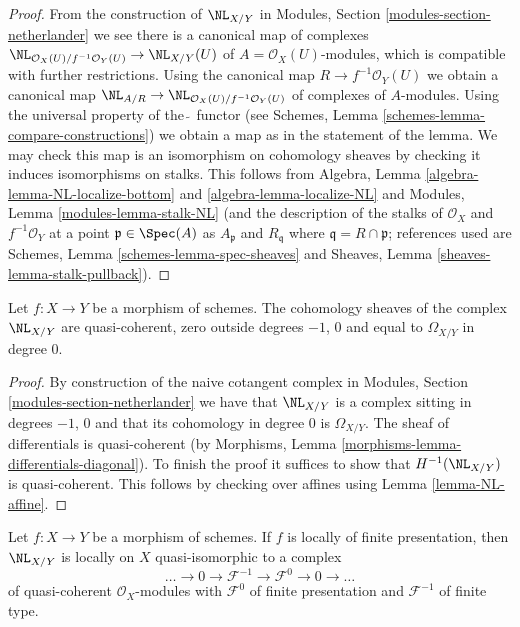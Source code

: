 \begin{proof}
From the construction of $\NL_{X/Y}$ in
Modules, Section \ref{modules-section-netherlander}
we see there is a canonical map of complexes
$\NL_{\mathcal{O}_X(U)/f^{-1}\mathcal{O}_Y(U)} \to \NL_{X/Y}(U)$
of $A = \mathcal{O}_X(U)$-modules, which is compatible
with further restrictions. Using the canonical map
$R \to f^{-1}\mathcal{O}_Y(U)$ we obtain a canonical map
$\NL_{A/R} \to \NL_{\mathcal{O}_X(U)/f^{-1}\mathcal{O}_Y(U)}$
of complexes of $A$-modules.
Using the universal property of the $\widetilde{\ }$
functor (see Schemes, Lemma \ref{schemes-lemma-compare-constructions})
we obtain a map as in the statement of the lemma.
We may check this map is an isomorphism on cohomology sheaves
by checking it induces isomorphisms on stalks.
This follows from
Algebra, Lemma \ref{algebra-lemma-NL-localize-bottom} and
\ref{algebra-lemma-localize-NL}
and
Modules, Lemma \ref{modules-lemma-stalk-NL}
(and the description of the stalks of
$\mathcal{O}_X$ and $f^{-1}\mathcal{O}_Y$
at a point $\mathfrak p \in \Spec(A)$ as $A_\mathfrak p$ and
$R_\mathfrak q$ where $\mathfrak q = R \cap \mathfrak p$; references
used are Schemes, Lemma \ref{schemes-lemma-spec-sheaves}
and
Sheaves, Lemma \ref{sheaves-lemma-stalk-pullback}).
\end{proof}

\begin{lemma}
\label{lemma-netherlander-quasi-coherent}
Let $f : X \to Y$ be a morphism of schemes. The cohomology sheaves
of the complex $\NL_{X/Y}$ are quasi-coherent, zero outside
degrees $-1$, $0$ and equal to $\Omega_{X/Y}$ in degree $0$.
\end{lemma}

\begin{proof}
By construction of the naive cotangent complex in
Modules, Section \ref{modules-section-netherlander}
we have that $\NL_{X/Y}$ is a complex sitting in degrees $-1$, $0$
and that its cohomology in degree $0$ is $\Omega_{X/Y}$.
The sheaf of differentials is quasi-coherent (by
Morphisms, Lemma \ref{morphisms-lemma-differentials-diagonal}).
To finish the proof it suffices to show that $H^{-1}(\NL_{X/Y})$
is quasi-coherent. This follows by checking over affines
using Lemma \ref{lemma-NL-affine}.
\end{proof}

\begin{lemma}
\label{lemma-netherlander-fp}
Let $f : X \to Y$ be a morphism of schemes. If $f$ is locally of finite
presentation, then $\NL_{X/Y}$ is locally on $X$ quasi-isomorphic to
a complex
$$
\ldots \to 0 \to \mathcal{F}^{-1} \to \mathcal{F}^0 \to 0 \to \ldots
$$
of quasi-coherent $\mathcal{O}_X$-modules
with $\mathcal{F}^0$ of finite presentation
and $\mathcal{F}^{-1}$ of finite type.
\end{lemma}

